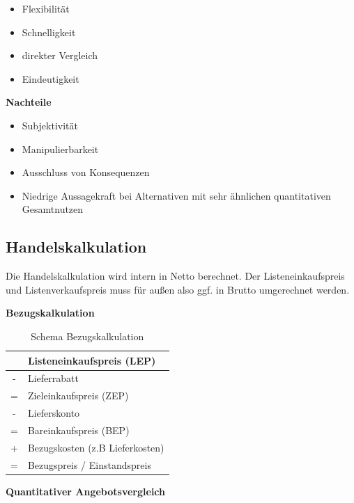 \begin{itemize}
    \item Flexibilität
    \item Schnelligkeit
    \item direkter Vergleich
    \item Eindeutigkeit
\end{itemize}

\textbf{Nachteile}

\begin{itemize}
    \item Subjektivität
    \item Manipulierbarkeit
    \item Ausschluss von Konsequenzen
    \item Niedrige Aussagekraft bei Alternativen mit sehr ähnlichen quantitativen Gesamtnutzen
\end{itemize}

\subsection{Handelskalkulation}

Die Handelskalkulation wird intern in Netto berechnet. Der Listeneinkaufspreis und Listenverkaufspreis muss für außen also ggf. in Brutto umgerechnet werden.

\textbf{Bezugskalkulation}

\begin{table}[H]
    \centering
    \begin{tabularx}{\textwidth}{c|X}
          & Listeneinkaufspreis (LEP)       \\
        \hline
        - & Lieferrabatt                    \\
        \hline
        = & Zieleinkaufspreis (ZEP)         \\
        \hline
        - & Lieferskonto                    \\
        \hline
        = & Bareinkaufspreis (BEP)          \\
        \hline
        + & Bezugskosten (z.B Lieferkosten) \\
        \hline
        = & Bezugspreis / Einstandspreis    \\
    \end{tabularx}
    \caption{Schema Bezugskalkulation}
    \label{tab:bezugskalkulation}
\end{table}

\textbf{Quantitativer Angebotsvergleich}

